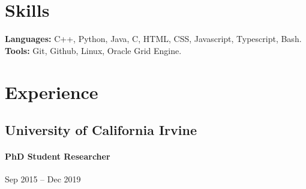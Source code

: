 \documentclass[letterpaper,10pt,oneside]{article}
\begin{document}
\section*{Skills}
\textbf{Languages:} C++, Python, Java, C, HTML, CSS, Javascript, Typescript, Bash.~
\textbf{Tools:} Git, Github, Linux, Oracle Grid Engine.

\section*{Experience}
\subsection*{University of California Irvine}
\vspace{-3px}
\paragraph*{PhD Student Researcher} \hfill Sep 2015 -- Dec 2019
\end{document}
